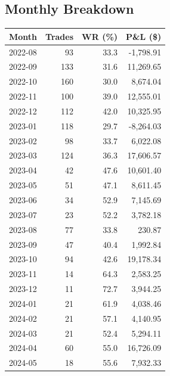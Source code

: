 \documentclass[11pt,a4paper,twoside]{article}
\begin{document}
\subsection*{Monthly Breakdown}
\noindent\begin{center}
\begin{tabular}{>{\color{txtmain}}l rrr}
\toprule
\rowcolor{cardbg}
\textbf{Month} & \textbf{Trades} & \textbf{WR (\%)} & \textbf{P\&L (\$)} \\
\midrule
2022-08 & 93 & 33.3 & \textcolor{lossred}{-1,798.91} \\
2022-09 & 133 & 31.6 & \textcolor{wingreen}{11,269.65} \\
2022-10 & 160 & 30.0 & \textcolor{wingreen}{8,674.04} \\
2022-11 & 100 & 39.0 & \textcolor{wingreen}{12,555.01} \\
2022-12 & 112 & 42.0 & \textcolor{wingreen}{10,325.95} \\
2023-01 & 118 & 29.7 & \textcolor{lossred}{-8,264.03} \\
2023-02 & 98 & 33.7 & \textcolor{wingreen}{6,022.08} \\
2023-03 & 124 & 36.3 & \textcolor{wingreen}{17,606.57} \\
2023-04 & 42 & 47.6 & \textcolor{wingreen}{10,601.40} \\
2023-05 & 51 & 47.1 & \textcolor{wingreen}{8,611.45} \\
2023-06 & 34 & 52.9 & \textcolor{wingreen}{7,145.69} \\
2023-07 & 23 & 52.2 & \textcolor{wingreen}{3,782.18} \\
2023-08 & 77 & 33.8 & \textcolor{wingreen}{230.87} \\
2023-09 & 47 & 40.4 & \textcolor{wingreen}{1,992.84} \\
2023-10 & 94 & 42.6 & \textcolor{wingreen}{19,178.34} \\
2023-11 & 14 & 64.3 & \textcolor{wingreen}{2,583.25} \\
2023-12 & 11 & 72.7 & \textcolor{wingreen}{3,944.25} \\
2024-01 & 21 & 61.9 & \textcolor{wingreen}{4,038.46} \\
2024-02 & 21 & 57.1 & \textcolor{wingreen}{4,140.95} \\
2024-03 & 21 & 52.4 & \textcolor{wingreen}{5,294.11} \\
2024-04 & 60 & 55.0 & \textcolor{wingreen}{16,726.09} \\
2024-05 & 18 & 55.6 & \textcolor{wingreen}{7,932.33} \\

\end{tabular}
\end{center}
\end{document}
